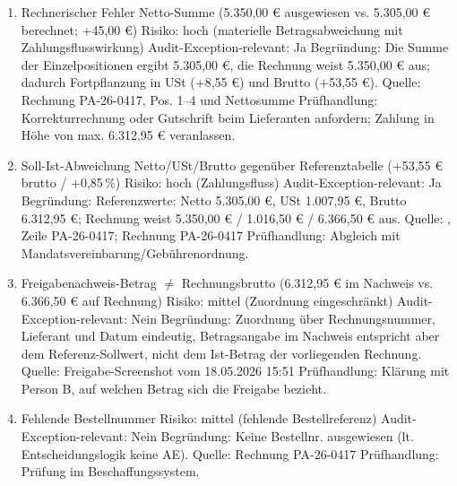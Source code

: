 \begin{enumerate}
    \item Rechnerischer Fehler Netto-Summe (5.350,00 € ausgewiesen vs. 5.305,00 € berechnet; +45,00 €)\newline
    Risiko: hoch (materielle Betragsabweichung mit Zahlungsflusswirkung)\newline
    Audit-Exception-relevant: Ja\newline
    Begründung: Die Summe der Einzelpositionen ergibt 5.305,00 €, die Rechnung weist 5.350,00 € aus; dadurch Fortpflanzung in USt (+8,55 €) und Brutto (+53,55 €).\newline
    Quelle: Rechnung PA-26-0417, Pos. 1--4 und Nettosumme\newline
    Prüfhandlung: Korrekturrechnung oder Gutschrift beim Lieferanten anfordern; Zahlung in Höhe von max. 6.312,95 € veranlassen.
    \item Soll-Ist-Abweichung Netto/\hspace{0pt}USt/\hspace{0pt}Brutto gegenüber Referenztabelle (+53,55 € brutto / +0,85\,\%)\newline
    Risiko: hoch (Zahlungsfluss)\newline
    Audit-Exception-relevant: Ja\newline
    Begründung: Referenzwerte: Netto 5.305,00 €, USt 1.007,95 €, Brutto 6.312,95 €; Rechnung weist 5.350,00 € / 1.016,50 € / 6.366,50 € aus.\newline
    Quelle: , Zeile PA-26-0417; Rechnung PA-26-0417\newline
    Prüfhandlung: Abgleich mit Mandatsvereinbarung/Gebührenordnung.
    \item Freigabenachweis-Betrag $\neq$ Rechnungsbrutto (6.312,95 € im Nachweis vs. 6.366,50 € auf Rechnung)\newline
    Risiko: mittel (Zuordnung eingeschränkt)\newline
    Audit-Exception-relevant: Nein\newline
    Begründung: Zuordnung über Rechnungsnummer, Lieferant und Datum eindeutig, Betragsangabe im Nachweis entspricht aber dem Referenz-Sollwert, nicht dem Ist-Betrag der vorliegenden Rechnung.\newline
    Quelle: Freigabe-Screenshot vom 18.05.2026 15:51\newline
    Prüfhandlung: Klärung mit Person B, auf welchen Betrag sich die Freigabe bezieht.
    \item Fehlende Bestellnummer\newline
    Risiko: mittel (fehlende Bestellreferenz)\newline
    Audit-Exception-relevant: Nein\newline
    Begründung: Keine Bestellnr. ausgewiesen (lt. Entscheidungslogik keine AE).\newline
    Quelle: Rechnung PA-26-0417\newline
    Prüfhandlung: Prüfung im Beschaffungssystem.
\end{enumerate}

